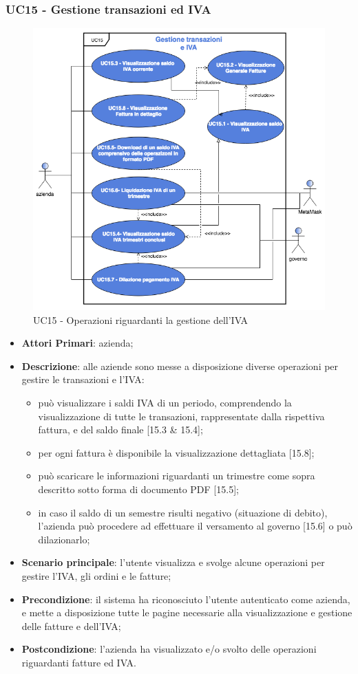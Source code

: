 \subsubsection{UC15 - Gestione transazioni ed IVA}
\begin{figure}[H]
	\includegraphics[width=12cm]{res/images/UC15-OK.png}
	\centering
	\caption{UC15 - Operazioni riguardanti la gestione dell'IVA}
\end{figure}
\begin{itemize}
	\item \textbf{Attori Primari}: azienda;
	\item \textbf{Descrizione}: alle aziende sono messe a disposizione diverse operazioni per gestire le transazioni e l'IVA:
	\begin{itemize}
		\item può visualizzare i saldi IVA di un periodo, comprendendo la visualizzazione di tutte le transazioni, rappresentate dalla rispettiva fattura, e del saldo finale [15.3 \& 15.4];
		\item per ogni fattura è disponibile la visualizzazione dettagliata [15.8];
		\item può scaricare le informazioni riguardanti un trimestre come sopra descritto sotto forma di documento PDF [15.5]; 
		\item in caso il saldo di un semestre risulti negativo (situazione di debito), l'azienda può procedere ad effettuare il versamento al governo [15.6] o può dilazionarlo\glosp [15.7];
	\end{itemize}
	\item \textbf{Scenario principale}: l'utente visualizza e svolge alcune operazioni per gestire l'IVA, gli ordini e le fatture;
	\item \textbf{Precondizione}: il sistema ha riconosciuto l'utente autenticato come azienda, e mette a disposizione tutte le pagine necessarie alla visualizzazione e gestione delle fatture e dell'IVA;
	\item \textbf{Postcondizione}: l'azienda ha visualizzato e/o svolto delle operazioni riguardanti fatture ed IVA.
\end{itemize} 
